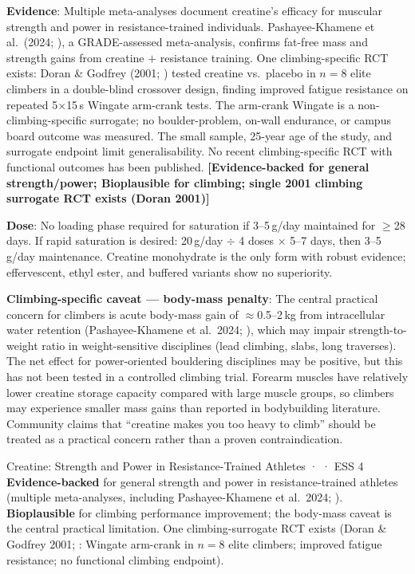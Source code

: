 \textbf{Evidence}: Multiple meta-analyses document creatine's efficacy for muscular strength and power in resistance-trained individuals. Pashayee-Khamene et al.\ (2024; \cite{PKHA+24}), a GRADE-assessed meta-analysis, confirms fat-free mass and strength gains from creatine $+$ resistance training. One climbing-specific RCT exists: Doran \& Godfrey (2001; \cite{DG01}) tested creatine vs.\ placebo in $n{=}8$ elite climbers in a double-blind crossover design, finding improved fatigue resistance on repeated 5$\times$15\,s Wingate arm-crank tests. The arm-crank Wingate is a non-climbing-specific surrogate; no boulder-problem, on-wall endurance, or campus board outcome was measured. The small sample, 25-year age of the study, and surrogate endpoint limit generalisability. No recent climbing-specific RCT with functional outcomes has been published. \textbf{[Evidence-backed for general strength/power; Bioplausible for climbing; single 2001 climbing surrogate RCT exists (Doran 2001)]}

\textbf{Dose}: No loading phase required for saturation if 3--5\,g/day maintained for $\geq$28 days. If rapid saturation is desired: 20\,g/day $\div$ 4 doses $\times$ 5--7 days, then 3--5\,g/day maintenance. Creatine monohydrate is the only form with robust evidence; effervescent, ethyl ester, and buffered variants show no superiority.

\textbf{Climbing-specific caveat --- body-mass penalty}: The central practical concern for climbers is acute body-mass gain of ${\approx}$0.5--2\,kg from intracellular water retention (Pashayee-Khamene et al.\ 2024; \cite{PKHA+24}), which may impair strength-to-weight ratio in weight-sensitive disciplines (lead climbing, slabs, long traverses). The net effect for power-oriented bouldering disciplines may be positive, but this has not been tested in a controlled climbing trial. Forearm muscles have relatively lower creatine storage capacity compared with large muscle groups, so climbers may experience smaller mass gains than reported in bodybuilding literature. Community claims that ``creatine makes you too heavy to climb'' should be treated as a practical concern rather than a proven contraindication.

\begin{evidencebox}{Creatine: Strength and Power in Resistance-Trained Athletes · \evidencebacked · ESS 4}
\textbf{Evidence-backed} for general strength and power in resistance-trained athletes (multiple meta-analyses, including Pashayee-Khamene et al.\ 2024; \cite{PKHA+24}). \textbf{Bioplausible} for climbing performance improvement; the body-mass caveat is the central practical limitation. One climbing-surrogate RCT exists (Doran \& Godfrey 2001; \cite{DG01}: Wingate arm-crank in $n{=}8$ elite climbers; improved fatigue resistance; no functional climbing endpoint).
\end{evidencebox}

